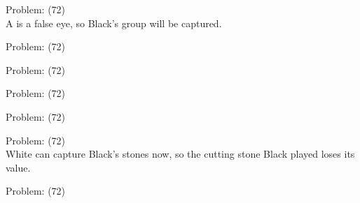 \documentclass[11pt]{article}
\begin{document}
\begin{minipage}[t]{0.5\textwidth}
  {\centering
  
  Problem: (72)\\
  A is a false eye, so Black's group will be captured.\\
  }
\end{minipage}
\begin{minipage}[t]{0.5\textwidth}
  {\centering
  
  Problem: (72)\\
  
  }
\end{minipage}
\begin{minipage}[t]{0.5\textwidth}
  {\centering
  
  Problem: (72)\\
  
  }
\end{minipage}
\begin{minipage}[t]{0.5\textwidth}
  {\centering
  
  Problem: (72)\\
  
  }
\end{minipage}
\begin{minipage}[t]{0.5\textwidth}
  {\centering
  
  Problem: (72)\\
  
  }
\end{minipage}
\begin{minipage}[t]{0.5\textwidth}
  {\centering
  
  Problem: (72)\\
  White can capture Black's stones now, so the cutting stone Black played loses its value.\\
  }
\end{minipage}
\begin{minipage}[t]{0.5\textwidth}
  {\centering
  
  Problem: (72)\\
  
  }
\end{minipage}
\end{document}

